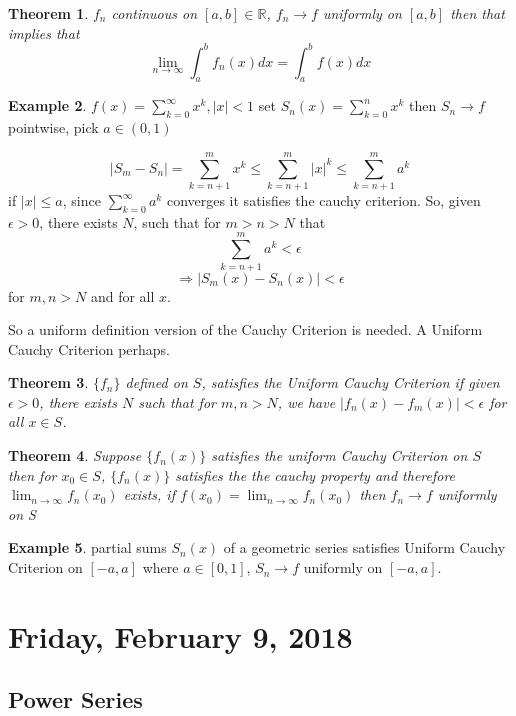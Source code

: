 \documentclass[12pt]{article}
\theoremstyle{plain}
\newtheorem{theorem}{Theorem}[section]
\theoremstyle{definition}
\newtheorem{example}[theorem]{Example}
\begin{document}
\begin{theorem}
	$f_n$ continuous on $[a,b] \in \mathbb{R}$, $f_n \to f$ uniformly on $[a,b]$ then that implies that
	$$\lim_{n\to\infty} \int_a^b f_n (x) dx = \int_a^b f (x) dx$$
\end{theorem}

\begin{example}
	$f(x) = \sum^\infty_{k=0} x^k, |x| < 1$ set $S_n (x) = \sum^n_{k=0} x^k$ then $S_n \to f$ pointwise, pick $a\in (0,1)$
	
	$$|S_m - S_n| = \sum^m_{k=n+1} x^k \leq \sum^m_{k=n+1} |x|^k \leq \sum^m_{k=n+1} a^k$$ if $|x| \leq a$, since $\sum^\infty_{k=0} a^k$ converges it satisfies the cauchy criterion. So, given $\epsilon > 0$, there exists $N$, such that for $m > n > N$ that
	$$\sum^m_{k=n+1} a^k < \epsilon$$
	$$\Longrightarrow |S_m (x) - S_n (x) | < \epsilon$$ for $m,n > N$ and for all $x$.
	
\end{example}

So a uniform definition version of the Cauchy Criterion is needed. A Uniform Cauchy Criterion perhaps.\\

\begin{theorem}
$\{ f_n \}$ defined on $S$, satisfies the Uniform Cauchy Criterion if given $\epsilon > 0$, there exists $N$ such that for $m,n > N$, we have $|f_n (x) - f_m (x)|< \epsilon$ for all $x\in S$.
\end{theorem}

\begin{theorem}
	Suppose $\{ f_n (x) \}$ satisfies the uniform Cauchy Criterion on $S$ then for $x_0 \in S$, $\{ f_n (x) \}$ satisfies the the cauchy property and therefore $\lim_{n\to\infty} f_n (x_0)$ exists, if $f(x_0) = \lim_{n\to\infty} f_n (x_0)$ then $f_n \to f$ uniformly on S
\end{theorem}

\begin{example}
	partial sums $S_n (x)$ of a geometric series satisfies Uniform Cauchy Criterion on $[-a, a]$ where $a \in [0,1]$, $S_n \to f$ uniformly on $[-a, a]$.
\end{example}

\newpage

\section{Friday, February 9, 2018}

\subsection{Power Series}
\end{document}
